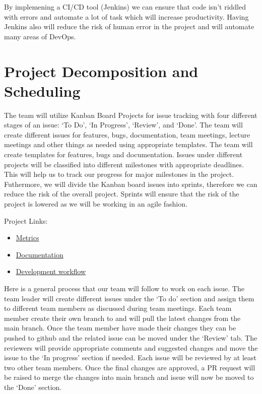 \documentclass{article}
\begin{document}
By implemening a CI/CD tool (Jenkins) we can ensure that code isn't riddled with errors and automate a lot of task which will increase productivity. Having Jenkins also will reduce the risk of human error in the project and will automate many areas of DevOps. 

\section{Project Decomposition and Scheduling}

The team will utilize Kanban Board Projects for issue tracking with four different stages of an issue: ‘To Do’, ‘In Progress’, ‘Review’, and ‘Done’. The team will create different issues for features, bugs, documentation, team meetings, lecture meetings and other things as needed using appropriate templates. The team will create templates for features, bugs and documentation. Issues under different projects will be classified into different milestones with appropriate deadlines. This will help us to track our progress for major milestones in the project. 
Futhermore, we will divide the Kanban board issues into sprints, therefore we can reduce the risk of the overall project. Sprints will ensure that the risk of the project is lowered as we will be working in an agile fashion.

Project Links:
\begin{itemize}
\item  
\href{https://github.com/users/Inreet-Kaur/projects/4}{Metrics}
\item  
\href{https://github.com/users/Inreet-Kaur/projects/2}{Documentation} 
\item 
\href{https://github.com/users/Inreet-Kaur/projects/6}{Development workflow}
\end{itemize}

Here is a general process that our team will follow to work on each issue. The team leader will create different issues under the ‘To do’ section and assign them to different team members as discussed during team meetings. Each team member create their own branch to and will pull the latest changes from the main branch. Once the team member have made their changes they can be pushed to github and the related issue can be moved under the ‘Review’ tab. The reviewers will provide appropriate comments and suggested changes and move the issue to the ‘In progress’ section if needed. Each issue will be reviewed by at least two other team members. Once the final changes are approved, a PR request will be raised to merge the changes into main branch and issue will now be moved to the ‘Done’ section. 
\end{document}
